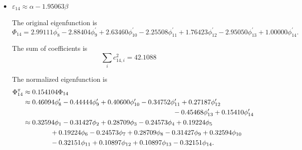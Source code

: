 \begin{itemize}
		
		\item $\varepsilon_{14} \approx \alpha - 1.95063 \beta$
		
		The original eigenfunction is
		\begin{equation*}
			\Phi_{14} =  2.99111 \phi^\prime_8 -2.88404 \phi^\prime_9 + 2.63460 \phi^\prime_{10} -2.25508 \phi^\prime_{11}   + 1.76423 \phi^\prime_{12} - 2.95050  \phi^\prime_{13} + 1.00000 \phi^\prime_{14}.
		\end{equation*}
		
		The sum of coefficients is
		\begin{equation*}
			\sum_{i} c^2_{14,i} = 42.1088
		\end{equation*}
		
		The normalized eigenfunction is		
		\begin{align}
			\Phi^\pi_{14} &\approx 0.154104 \Phi_{14} \notag \\
			&\approx 0.46094 \phi^\prime_8 -0.44444 \phi^\prime_9  + 0.40600 \phi^\prime_{10} -0.34752 \phi^\prime_{11} + 0.27187 \phi^\prime_{12}  \notag\\
			&\hspace*{22em} -0.45468 \phi^\prime_{13} + 0.15410 \phi^\prime_{14} \notag \\
			&\approx 0.32594 \phi_1 -0.31427 \phi_2  + 0.28709 \phi_3 -0.24573 \phi_4 +0.19224 \phi_5  \notag \\
			&\hspace*{4em}  +0.19224 \phi_6  -0.24573 \phi_7 + 0.28709 \phi_8  -0.31427 \phi_9   + 0.32594 \phi_{10} \notag \\
			&\hspace*{4em} -0.32151 \phi_{11} + 0.10897 \phi_{12}  + 0.10897 \phi_{13} -0.32151 \phi_{14} .
		\end{align}
		
		\end{itemize}
		
